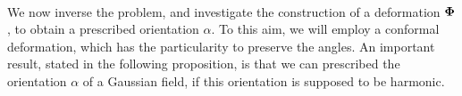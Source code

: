 \documentclass{elsarticle}
\newtheorem{proposition}{Proposition}
\newenvironment{proof}{\medskip\noindent{\bf Proof.}\;}{\null\hfill $\Box$\par\medskip }
\begin{document}
\

We now inverse the problem, and investigate the construction of a deformation $\mathbf{\Phi}$, to obtain a prescribed orientation $\alpha$. To this aim, we will employ a conformal deformation, which has the particularity to preserve the angles. 
%
%
%
An important result,  stated  in the following proposition, is that we can prescribed the orientation $\alpha$ of a Gaussian field, if this orientation  is supposed to be harmonic. 
\end{document}

